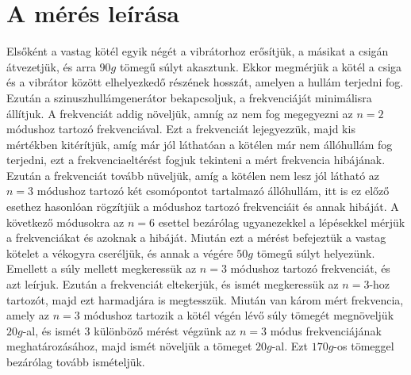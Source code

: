 \documentclass[10pt,pdftex]{report}
\begin{document}
\section*{A mérés leírása}
Elsőként a vastag kötél egyik négét a vibrátorhoz erősítjük, a másikat a csigán átvezetjük, és arra $90g$ tömegű súlyt akasztunk. Ekkor megmérjük a kötél a csiga és a vibrátor között elhelyezkedő részének hosszát, amelyen a hullám terjedni fog. Ezután a szinuszhullámgenerátor bekapcsoljuk, a frekvenciáját minimálisra állítjuk. A frekvenciát addig növeljük, amníg az nem fog megegyezni az $n=2$ módushoz tartozó frekvenciával. Ezt a frekvenciát lejegyezzük, majd kis mértékben kitérítjük, amíg már jól láthatóan a kötélen már nem állóhullám fog terjedni, ezt a frekvenciaeltérést fogjuk tekinteni a mért frekvencia hibájának. Ezután a frekvenciát tovább nüveljük, amíg a kötélen nem lesz jól látható az $n=3$ módushoz tartozó két csomópontot tartalmazó állóhullám, itt is ez előző esethez hasonlóan rögzítjük a módushoz tartozó frekvenciáit és annak hibáját. A következő módusokra az $n=6$ esettel bezárólag ugyanezekkel a lépésekkel mérjük a frekvenciákat és azoknak a hibáját. Miután ezt a mérést befejeztük a vastag kötelet a vékogyra cseréljük, és annak a végére $50g$ tömegű súlyt helyezünk. Emellett a súly mellett megkeressük az $n=3$ módushoz tartozó frekvenciát, és azt leírjuk. Ezután a frekvenciát eltekerjük, és ismét megkeressük az $n=3$-hoz tartozót, majd ezt harmadjára is megtesszük. Miután van károm mért frekvencia, amely az $n=3$ módushoz tartozik a kötél végén lévő súly tömegét megnöveljük $20g$-al, és ismét 3 különböző mérést végzünk az $n=3$ módus frekvenciájának meghatározásához, majd ismét növeljük a tömeget $20g$-al. Ezt $170g$-os tömeggel bezárólag tovább ismételjük.
\end{document}
